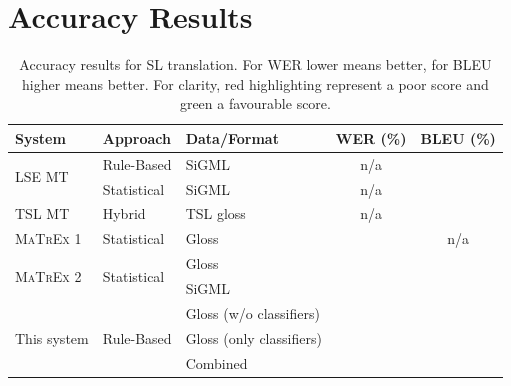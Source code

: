 \documentclass[12pt]{ociamthesis}  %
\begin{document}
\section{Accuracy Results}
\label{results}
{\renewcommand{\arraystretch}{1.2}
\begin{table}[H]
\center
\small
\begin{tabular}{lllcc}
\hline
System & Approach & Data/Format & WER (\%) & BLEU (\%) \\
\hline
\multirow{ 2}{*}{LSE MT} & Rule-Based & SiGML & n/a & \cellcolor[rgb]{0.8,1,0}{64.33} \\
& Statistical & SiGML & n/a & \cellcolor[rgb]{0.5,1,0}{68.23} \\
\hline
TSL MT & Hybrid & TSL gloss & n/a & \cellcolor[rgb]{0.2,1,0}{86} \\
\hline
\textsc{MaTrEx} 1 & Statistical & Gloss & \cellcolor[rgb]{0.7,1,0}{41.68} & n/a \\
\hline
\multirow{ 2}{*}{\textsc{MaTrEx} 2} & \multirow{ 2}{*}{Statistical} & Gloss & \cellcolor[rgb]{1,0.4,0}{80.37} & \cellcolor[rgb]{1,0.1,0}{31.84} \\
& & SiGML & \cellcolor[rgb]{1,1,0}{54.46} & \cellcolor[rgb]{1,0.8,0}{45.64} \\  
\hline
\multirow{ 3}{*}{This system} & \multirow{ 3}{*}{Rule-Based} & Gloss (w/o classifiers) & \cellcolor[rgb]{1,1,0}{54.88} & \cellcolor[rgb]{0.8,1,0}{64.26} \\
& & Gloss (only classifiers) & \cellcolor[rgb]{1,0.2,0}{86.34} & \cellcolor[rgb]{1,0.65,0}{40.69} \\
& & Combined & \cellcolor[rgb]{1,0.85,0}{61.47} & \cellcolor[rgb]{0.95,1,0}{57.40} \\ 
\hline
\end{tabular}
\caption[System accuracy results for SL translation]{Accuracy results for SL translation. For WER lower means better, for BLEU higher means better. For clarity, red highlighting represent a poor score and green a favourable score.}
\label{table:results}
\end{table}
}
\end{document}

